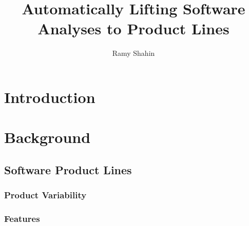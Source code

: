 \documentclass[11pt]{article} %
\title{Automatically Lifting Software Analyses to Product Lines}
\author{Ramy Shahin}
\begin{document}
\maketitle

\theoremstyle{definition}
\newtheorem{exmp}{Example}[section]

\section{Introduction}



\section{Background}

\subsection{Software Product Lines}

\subsubsection{Product Variability}

\subsubsection{Features}
\end{document}
